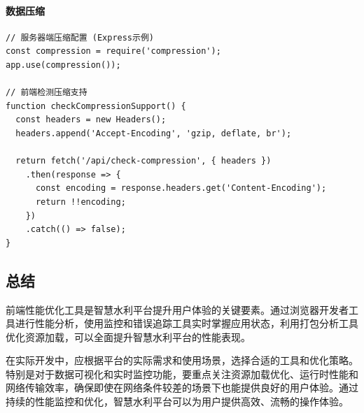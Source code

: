 \paragraph{数据压缩}\label{ux6570ux636eux538bux7f29}

\begin{lstlisting}
// 服务器端压缩配置 (Express示例)
const compression = require('compression');
app.use(compression());

// 前端检测压缩支持
function checkCompressionSupport() {
  const headers = new Headers();
  headers.append('Accept-Encoding', 'gzip, deflate, br');
  
  return fetch('/api/check-compression', { headers })
    .then(response => {
      const encoding = response.headers.get('Content-Encoding');
      return !!encoding;
    })
    .catch(() => false);
}
\end{lstlisting}

\subsection{总结}\label{ux603bux7ed3}

前端性能优化工具是智慧水利平台提升用户体验的关键要素。通过浏览器开发者工具进行性能分析，使用监控和错误追踪工具实时掌握应用状态，利用打包分析工具优化资源加载，可以全面提升智慧水利平台的性能表现。

在实际开发中，应根据平台的实际需求和使用场景，选择合适的工具和优化策略。特别是对于数据可视化和实时监控功能，要重点关注资源加载优化、运行时性能和网络传输效率，确保即使在网络条件较差的场景下也能提供良好的用户体验。通过持续的性能监控和优化，智慧水利平台可以为用户提供高效、流畅的操作体验。
